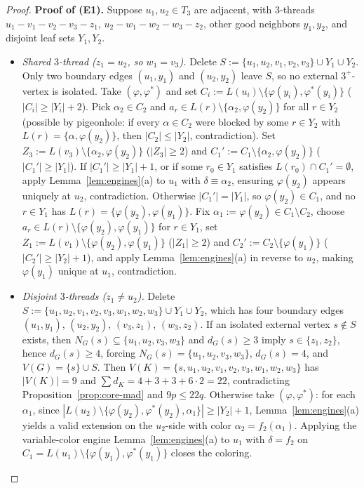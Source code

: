\documentclass[11pt,a4paper]{article}
\theoremstyle{definition}
\begin{document}
\begin{proof}
\medskip
\noindent\textbf{Proof of (E1).} Suppose $u_1, u_2 \in T_3$ are adjacent, with $3$-threads $u_1 - v_1 - v_2 - v_3 - z_1$, $u_2 - w_1 - w_2 - w_3 - z_2$, other good neighbors $y_1, y_2$, and disjoint leaf sets $Y_1, Y_2$.
\begin{itemize}[leftmargin=*,itemsep=2pt]
  \item \emph{Shared $3$-thread ($z_1 = u_2$, so $w_1 = v_3$).} Delete $S := \{u_1, u_2, v_1, v_2, v_3\} \cup Y_1 \cup Y_2$. Only two boundary edges $(u_1, y_1)$ and $(u_2, y_2)$ leave $S$, so no external $3^+$-vertex is isolated. Take $(\varphi, \varphi^*)$ and set $C_i := L(u_i) \setminus \{\varphi(y_i), \varphi^*(y_i)\}$ ($|C_i| \ge |Y_i| + 2$). Pick $\alpha_2 \in C_2$ and $a_r \in L(r) \setminus \{\alpha_2, \varphi(y_2)\}$ for all $r \in Y_2$ (possible by pigeonhole: if every $\alpha \in C_2$ were blocked by some $r \in Y_2$ with $L(r) = \{\alpha, \varphi(y_2)\}$, then $|C_2| \le |Y_2|$, contradiction). Set $Z_3 := L(v_3) \setminus \{\alpha_2, \varphi(y_2)\}$ ($|Z_3| \ge 2$) and $C_1' := C_1 \setminus \{\alpha_2, \varphi(y_2)\}$ ($|C_1'| \ge |Y_1|$). If $|C_1'| \ge |Y_1| + 1$, or if some $r_0 \in Y_1$ satisfies $L(r_0) \cap C_1' = \emptyset$, apply Lemma~\ref{lem:engines}(a) to $u_1$ with $\delta \equiv \alpha_2$, ensuring $\varphi(y_2)$ appears uniquely at $u_2$, contradiction. Otherwise $|C_1'| = |Y_1|$, so $\varphi(y_2) \in C_1$, and no $r \in Y_1$ has $L(r) = \{\varphi(y_2), \varphi(y_1)\}$. Fix $\alpha_1 := \varphi(y_2) \in C_1 \setminus C_2$, choose $a_r \in L(r) \setminus \{\varphi(y_2), \varphi(y_1)\}$ for $r \in Y_1$, set $Z_1 := L(v_1) \setminus \{\varphi(y_2), \varphi(y_1)\}$ ($|Z_1| \ge 2$) and $C_2' := C_2 \setminus \{\varphi(y_1)\}$ ($|C_2'| \ge |Y_2| + 1$), and apply Lemma~\ref{lem:engines}(a) in reverse to $u_2$, making $\varphi(y_1)$ unique at $u_1$, contradiction.
  \item \emph{Disjoint $3$-threads ($z_1 \neq u_2$).} Delete $S := \{u_1, u_2, v_1, v_2, v_3, w_1, w_2, w_3\} \cup Y_1 \cup Y_2$, which has four boundary edges $(u_1, y_1)$, $(u_2, y_2)$, $(v_3, z_1)$, $(w_3, z_2)$. If an isolated external vertex $s \notin S$ exists, then $N_G(s) \subseteq \{u_1, u_2, v_3, w_3\}$ and $d_G(s) \ge 3$ imply $s \in \{z_1, z_2\}$, hence $d_G(s) \ge 4$, forcing $N_G(s) = \{u_1, u_2, v_3, w_3\}$, $d_G(s) = 4$, and $V(G) = \{s\} \cup S$. Then $V(K) = \{s, u_1, u_2, v_1, v_2, v_3, w_1, w_2, w_3\}$ has $|V(K)| = 9$ and $\sum d_K = 4 + 3 + 3 + 6 \cdot 2 = 22$, contradicting Proposition~\ref{prop:core-mad} and $9p \le 22q$. Otherwise take $(\varphi, \varphi^*)$: for each $\alpha_1$, since $|L(u_2) \setminus \{\varphi(y_2), \varphi^*(y_2), \alpha_1\}| \ge |Y_2| + 1$, Lemma~\ref{lem:engines}(a) yields a valid extension on the $u_2$-side with color $\alpha_2 = f_2(\alpha_1)$. Applying the variable-color engine Lemma~\ref{lem:engines}(a) to $u_1$ with $\delta = f_2$ on $C_1 = L(u_1) \setminus \{\varphi(y_1), \varphi^*(y_1)\}$ closes the coloring.
\end{itemize}


\end{proof}
\end{document}
